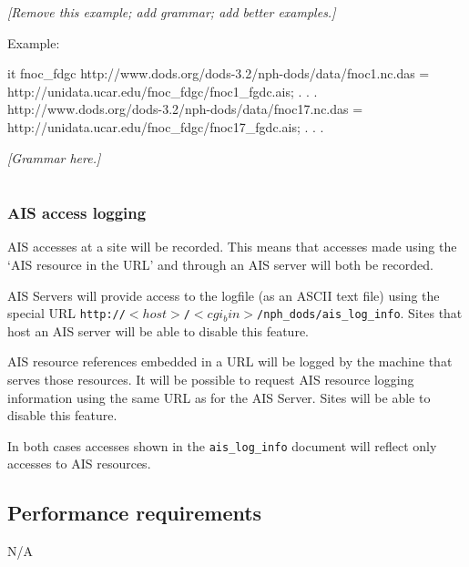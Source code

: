 \documentclass{article}
\begin{document}
\emph{[Remove this example; add grammar; add better examples.]}

Example:\\
\begin{vcode}{it}
fnoc_fdgc {
    http://www.dods.org/dods-3.2/nph-dods/data/fnoc1.nc.das =
        http://unidata.ucar.edu/fnoc_fdgc/fnoc1_fgdc.ais;
    .
    .
    .
    http://www.dods.org/dods-3.2/nph-dods/data/fnoc17.nc.das =
        http://unidata.ucar.edu/fnoc_fdgc/fnoc17_fgdc.ais;
    .
    .
    .
}
\end{vcode}

\emph{[Grammar here.]}

\begin{minipage}{5in}
\begin{ttfamily}
\begin{center}
\begin{tabular}{lll}

\end{tabular}
\end{center}
\end{ttfamily}
\end{minipage}

\subsubsection{AIS access logging}
\label{sec:logging}

AIS accesses at a site will be recorded. This means that accesses made using
the `\ac{AIS} resource in the URL' and through an \ac{AIS} server will both
be recorded. 

\ac{AIS} Servers will provide access to the logfile (as an ASCII text file)
using the special URL
\texttt{http://$<host>$/$<cgi_bin>$/nph\_dods/ais\_log\_info}. Sites that
host an \ac{AIS} server will be able to disable this feature.

\ac{AIS} resource references embedded in a URL will be logged by the machine
that serves those resources. It will be possible to request \ac{AIS} resource
logging information using the same URL as for the \ac{AIS} Server. Sites will
be able to disable this feature.

In both cases accesses shown in the \texttt{ais\_log\_info} document will
reflect only accesses to \ac{AIS} resources.

\subsection{Performance requirements}
N/A
\end{document}
